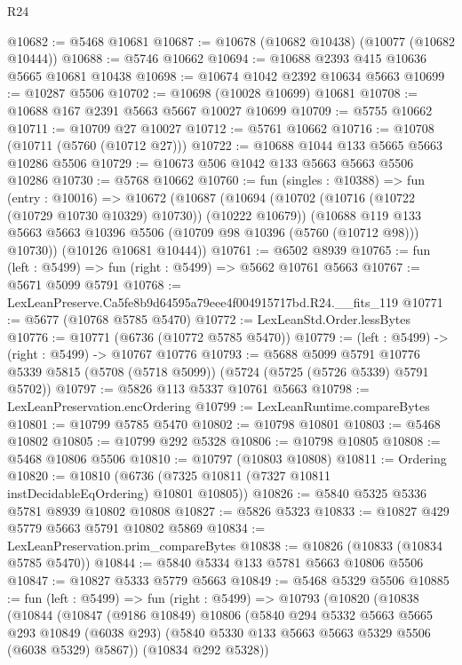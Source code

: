 \begin{lexlean}{R24}
\begin{coremodule}
@10682 := @5468 @10681
@10687 := @10678 (@10682 @10438) (@10077 (@10682 @10444))
@10688 := @5746 @10662
@10694 := @10688 @2393 @415 @10636 @5665 @10681 @10438
@10698 := @10674 @1042 @2392 @10634 @5663
@10699 := @10287 @5506
@10702 := @10698 (@10028 @10699) @10681
@10708 := @10688 @167 @2391 @5663 @5667 @10027 @10699
@10709 := @5755 @10662
@10711 := @10709 @27 @10027
@10712 := @5761 @10662
@10716 := @10708 (@10711 (@5760 (@10712 @27)))
@10722 := @10688 @1044 @133 @5665 @5663 @10286 @5506
@10729 := @10673 @506 @1042 @133 @5663 @5663 @5506 @10286
@10730 := @5768 @10662
@10760 := fun (singles : @10388) =>
  fun (entry : @10016) =>
  @10672
    (@10687
      (@10694
        (@10702 (@10716 (@10722 (@10729 @10730 @10329) @10730)) (@10222 @10679))
        (@10688 @119 @133 @5663 @5663 @10396 @5506 (@10709 @98 @10396 (@5760 (@10712 @98))) @10730))
      (@10126 @10681 @10444))
@10761 := @6502 @8939
@10765 := fun (left : @5499) => fun (right : @5499) => @5662 @10761 @5663
@10767 := @5671 @5099 @5791
@10768 := LexLeanPreserve.Ca5fe8b9d64595a79eee4f004915717bd.R24.__fits_119
@10771 := @5677 (@10768 @5785 @5470)
@10772 := LexLeanStd.Order.lessBytes
@10776 := @10771 (@6736 (@10772 @5785 @5470))
@10779 := (left : @5499) -> (right : @5499) -> @10767 @10776
@10793 := @5688
    @5099
    @5791
    @10776
    @5339
    @5815
    (@5708 (@5718 @5099))
    (@5724 (@5725 (@5726 @5339) @5791 @5702))
@10797 := @5826 @113 @5337 @10761 @5663
@10798 := LexLeanPreservation.encOrdering
@10799 := LexLeanRuntime.compareBytes
@10801 := @10799 @5785 @5470
@10802 := @10798 @10801
@10803 := @5468 @10802
@10805 := @10799 @292 @5328
@10806 := @10798 @10805
@10808 := @5468 @10806 @5506
@10810 := @10797 (@10803 @10808)
@10811 := Ordering
@10820 := @10810 (@6736 (@7325 @10811 (@7327 @10811 instDecidableEqOrdering) @10801 @10805))
@10826 := @5840 @5325 @5336 @5781 @8939 @10802 @10808
@10827 := @5826 @5323
@10833 := @10827 @429 @5779 @5663 @5791 @10802 @5869
@10834 := LexLeanPreservation.prim_compareBytes
@10838 := @10826 (@10833 (@10834 @5785 @5470))
@10844 := @5840 @5334 @133 @5781 @5663 @10806 @5506
@10847 := @10827 @5333 @5779 @5663
@10849 := @5468 @5329 @5506
@10885 := fun (left : @5499) =>
  fun (right : @5499) =>
  @10793
    (@10820
      (@10838
        (@10844
          (@10847
            (@9186 @10849)
            @10806
            (@5840
              @294
              @5332
              @5663
              @5665
              @293
              @10849
              (@6038 @293)
              (@5840 @5330 @133 @5663 @5663 @5329 @5506 (@6038 @5329) @5867))
            (@10834 @292 @5328))

\end{coremodule}
\end{lexlean}
